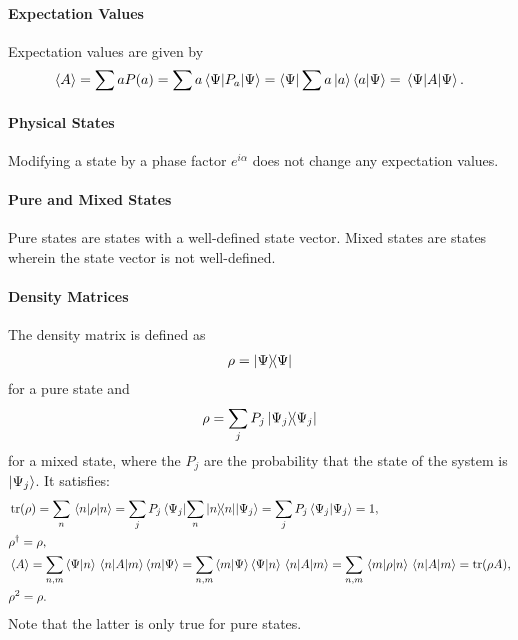 \paragraph{Expectation Values}
Expectation values are given by
\begin{align*}
	\expval{A} = \sum aP(a) = \sum a\expval{P_{a}}{\Psi} = \bra{\Psi}\sum a\ket{a}\bra{a}\ket{\Psi} = \expval{A}{\Psi}.
\end{align*}

\paragraph{Physical States}
Modifying a state by a phase factor $e^{i\alpha}$ does not change any expectation values.

\paragraph{Pure and Mixed States}
Pure states are states with a well-defined state vector. Mixed states are states wherein the state vector is not well-defined.

\paragraph{Density Matrices}
The density matrix is defined as
\begin{align*}
	\rho = \op{\Psi}{\Psi}
\end{align*}
for a pure state and
\begin{align*}
	\rho = \sum\limits_{j}P_{j}\op{\Psi_{j}}{\Psi_{j}}
\end{align*}
for a mixed state, where the $P_{j}$ are the probability that the state of the system is $\ket{\Psi_{j}}$. It satisfies:
\begin{align*}
	&\tr(\rho) = \sum\limits_{n}\expval{\rho}{n} = \sum\limits_{j}P_{j}\ev{\sum\limits_{n}\op{n}{n}}{\Psi_{j}} = \sum\limits_{j}P_{j}\braket{\Psi_{j}} = 1, \\
	&\adj{\rho} = \rho, \\
	&\expval{A} = \sum\limits_{n, m}\braket{\Psi}{n}\mel{n}{A}{m}\braket{m}{\Psi} = \sum\limits_{n, m}\braket{m}{\Psi}\braket{\Psi}{n}\mel{n}{A}{m} = \sum\limits_{n, m}\mel{m}{\rho}{n}\mel{n}{A}{m} = \tr(\rho A), \\
	&\rho^{2} = \rho.
\end{align*}
Note that the latter is only true for pure states.

